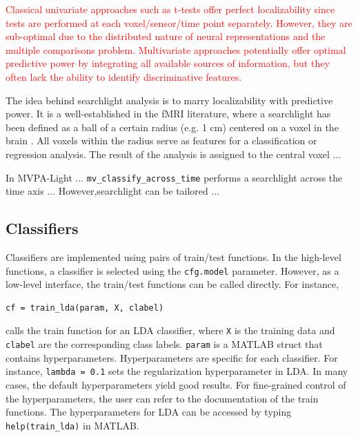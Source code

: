 \documentclass[utf8]{frontiersSCNS} %
\newcommand{\ttt}[1]{\texttt{#1}}
\newcommand{\red}[1]{\textcolor{red}{#1}}
\begin{document}
\red{Classical univariate approaches such as t-tests offer perfect localizability since tests are performed at each voxel/sensor/time point separately. However, they are sub-optimal due to the distributed nature of neural representations \citep{Haxby2001} and the multiple comparisons problem. Multivariate approaches potentially offer optimal predictive power by integrating all available sources of information, but they often lack the ability to identify discriminative features.}

The idea behind searchlight analysis is to marry localizability with predictive power. It is a well-established in the fMRI literature, where a searchlight has been defined as a ball of a certain radius (e.g. 1 cm) centered on a voxel in the brain \citep{Kriegeskorte2006Information-basedMapping}. All voxels within the radius serve as features for a classification or regression analysis. The result of the analysis is assigned to the central voxel ...

In MVPA-Light ... 
\ttt{mv\_classify\_across\_time} performs a searchlight across the time axis ... However,searchlight can be tailored ... 

\subsection{Classifiers}\label{sec:classifiers}

Classifiers are implemented using pairs of train/test functions. In the high-level functions, a classifier is selected using the \ttt{cfg.model} parameter. However, as a low-level interface, the train/test functions can be called directly. For instance, 

\begin{verbatim}
cf = train_lda(param, X, clabel)
\end{verbatim}

calls the train function for an LDA classifier, where \ttt{X} is the training data and \ttt{clabel} are the corresponding class labels. \ttt{param} is a MATLAB struct that contains hyperparameters. Hyperparameters are specific for each classifier. For instance, \ttt{lambda = 0.1} sets the regularization hyperparameter in LDA. In many cases, the default hyperparameters yield good results. For fine-grained control of the hyperparameters, the user can refer to the documentation of the train functions. The hyperparameters for LDA can be accessed by typing \ttt{help(train\_lda)} in MATLAB. 
\end{document}
